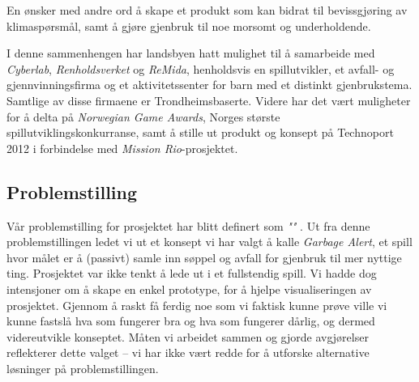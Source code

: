 En ønsker med andre ord å skape et
produkt som kan bidrat til bevissgjøring av klimaspørsmål, samt å gjøre
gjenbruk til noe morsomt og underholdende.

I denne sammenhengen har landsbyen hatt mulighet til å samarbeide med
\emph{Cyberlab}, \emph{Renholdsverket} og \emph{ReMida}, henholdsvis en
spillutvikler, et avfall- og gjennvinningsfirma og et aktivitetssenter
for barn med et distinkt gjenbrukstema. Samtlige av disse firmaene er
Trondheimsbaserte. Videre har det vært muligheter for å delta på
\emph{Norwegian Game Awards}, Norges største spillutviklingskonkurranse,
samt å stille ut produkt og konsept på Technoport 2012 i forbindelse med
\emph{Mission Rio}-prosjektet.

\subsection{Problemstilling} Vår problemstilling for prosjektet har
blitt definert som \emph{""} . Ut fra denne
problemstillingen ledet vi ut et konsept vi har valgt å kalle
\emph{Garbage Alert}, et spill hvor målet er å (passivt) samle inn
søppel og avfall for gjenbruk til mer nyttige ting. Prosjektet var ikke
tenkt å lede ut i et fullstendig spill. Vi hadde dog intensjoner om å
skape en enkel prototype, for å hjelpe visualiseringen av prosjektet.
Gjennom å raskt få ferdig noe som vi faktisk kunne prøve ville vi kunne
fastslå hva som fungerer bra og hva som fungerer dårlig, og dermed
videreutvikle konseptet. Måten vi arbeidet sammen og gjorde avgjørelser
reflekterer dette valget – vi har ikke vært redde for å utforske
alternative løsninger på problemstillingen.
